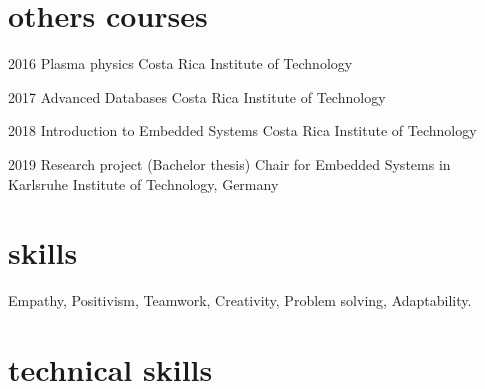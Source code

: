 \documentclass[]{friggeri-cv} %
\begin{document}

\section{others courses}

\begin{entrylist}


\entry
{2016}
{Plasma physics}
{Costa Rica Institute of Technology} 
{} 
{}


\entry
{2017}
{Advanced Databases}
{Costa Rica Institute of Technology} 
{} 
{}

\entry
{2018}
{Introduction to Embedded Systems}
{Costa Rica Institute of Technology} 
{} 
{}

\entry
{2019}
{Research project {\normalfont(Bachelor thesis)}}
{Chair for Embedded Systems in Karlsruhe Institute of Technology, Germany} 
{} 
{}


\end{entrylist}


\section{skills}
  \vspace{-0.2cm}

Empathy, Positivism, Teamwork, Creativity, Problem solving, Adaptability.



\section{technical skills}
\end{document}
